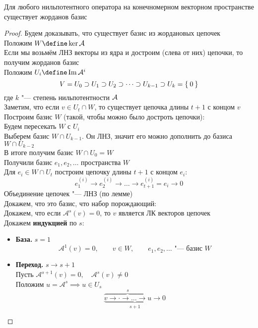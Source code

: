 \begin{theorem}
	Для любого нильпотентного оператора на конечномерном векторном пространстве существует жорданов базис
\end{theorem}

\begin{proof}
	Будем доказывать, что существует базис из жордановых цепочек \\
	Положим $ W \define \ker \mathcal{A} $ \\
	Если мы возьмём ЛНЗ векторы из ядра и достроим (слева от них) цепочки, то получим жорданов базис \\
	Положим $ U_i \define \Img \mathcal{A}^i $
	$$ V = U_0 \supset U_1 \supset U_2 \supset \dots \supset U_{k - 1} \supset U_k = \Set{0} $$
	где $ k $ "--- степень нильпотентности $ \mathcal{A} $ \\
	Заметим, что если $ v \in U_t \cap W $, то существует цепочка длины $ t + 1 $ с концом $ v $ \\
	Построим базис $ W $ (такой, чтобы можно было достроть цепочки): \\
	Будем пересекать $ W $ с $ U_i $ \\
	Выберем базис $ W \cap U_{k - 1} $. Он ЛНЗ, значит его можно дополнить до базиса $ W \cap U_{k - 2} $ \\
	В итоге получим базис $ W \cap U_0 = W $ \\
	Получили базис $ e_1, e_2, \dots $ пространства $ W $ \\
	Для $ e_i \in W \cap U_t $ построим цепочку длины $ t + 1 $ с концом $ e_i $:
	$$ e_1^{(i)} \to e_2^{(i)} \to \dots \to e_{t + 1}^{(i)} = e_i \to 0 $$
	Объединение цепочек "--- ЛНЗ (по лемме) \\
	Докажем, что это базис, \ie что набор порождающий: \\
	Докажем, что если $ \mathcal{A}^s(v) = 0 $, то $ v $ является ЛК векторов цепочек \\
	Докажем \textbf{индукцией} по $ s $:
	\begin{itemize}
		\item \textbf{База.} $ s = 1 $
		$$ \mathcal{A}^1(v) = 0, \qquad v \in W, \qquad e_1, e_2, \dots \text{ "--- базис } W $$
		\item \textbf{Переход.} $ s \to s + 1 $ \\
		Пусть $ \mathcal{A}^{s + 1}(v) = 0, \quad \mathcal{A}^s(v) \ne 0 $ \\
		Положим $ u = \mathcal{A}^s \implies u \in U_s $
		$$ \underbrace{\overbrace{v \to \cdot \to \dots \to u}^s \to 0}_{s + 1} $$

\end{itemize}
\end{proof}

